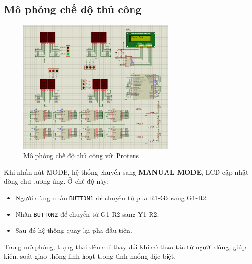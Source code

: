 \subsection{Mô phỏng chế độ thủ công}
\begin{figure}[H]
    \centering
    \includegraphics[width=0.7\textwidth]{pictures/manualproteus.png}
    \caption{Mô phỏng chế độ thủ công với Proteus}
\end{figure}
Khi nhấn nút MODE, hệ thống chuyển sang \textbf{MANUAL MODE}, LCD cập nhật dòng chữ tương ứng. Ở chế độ này:
\begin{itemize}
    \item Người dùng nhấn \texttt{BUTTON1} để chuyển từ pha R1-G2 sang G1-R2.
    \item Nhấn \texttt{BUTTON2} để chuyển từ G1-R2 sang Y1-R2.
    \item Sau đó hệ thống quay lại pha đầu tiên.
\end{itemize}
Trong mô phỏng, trạng thái đèn chỉ thay đổi khi có thao tác từ người dùng, giúp kiểm soát giao thông linh hoạt trong tình huống đặc biệt.


